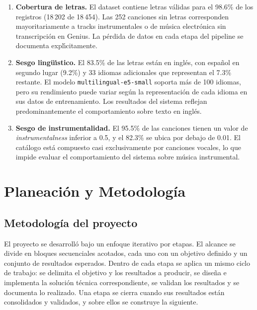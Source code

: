 \begin{enumerate}
    \item \textbf{Cobertura de letras.} El dataset contiene letras v\'{a}lidas para el 98.6\% de los registros (18\,202 de 18\,454). Las 252 canciones sin letras corresponden mayoritariamente a tracks instrumentales o de m\'{u}sica electr\'{o}nica sin transcripci\'{o}n en Genius. La p\'{e}rdida de datos en cada etapa del pipeline se documenta expl\'{\i}citamente.

    \item \textbf{Sesgo ling\"{u}\'{\i}stico.} El 83.5\% de las letras est\'{a}n en ingl\'{e}s, con espa\~{n}ol en segundo lugar (9.2\%) y 33 idiomas adicionales que representan el 7.3\% restante. El modelo \texttt{multilingual-}\allowbreak\texttt{e5-}\allowbreak\texttt{small} soporta m\'{a}s de 100 idiomas, pero su rendimiento puede variar seg\'{u}n la representaci\'{o}n de cada idioma en sus datos de entrenamiento. Los resultados del sistema reflejan predominantemente el comportamiento sobre texto en ingl\'{e}s.

    \item \textbf{Sesgo de instrumentalidad.} El 95.5\% de las canciones tienen un valor de \textit{instrumentalness} inferior a 0.5, y el 82.3\% se ubica por debajo de 0.01. El cat\'{a}logo est\'{a} compuesto casi exclusivamente por canciones vocales, lo que impide evaluar el comportamiento del sistema sobre m\'{u}sica instrumental.
\end{enumerate}

\section{Planeación y Metodología}
\label{sec:planeacion-metodologia}

\subsection{Metodología del proyecto}
\label{subsec:metodologia}

El proyecto se desarrolló bajo un enfoque iterativo por etapas. El alcance se divide en bloques secuenciales acotados, cada uno con un objetivo definido y un conjunto de resultados esperados. Dentro de cada etapa se aplica un mismo ciclo de trabajo: se delimita el objetivo y los resultados a producir, se diseña e implementa la solución técnica correspondiente, se validan los resultados y se documenta lo realizado. Una etapa se cierra cuando sus resultados están consolidados y validados, y sobre ellos se construye la siguiente.

